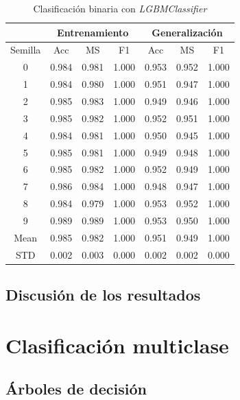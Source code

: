 \begin{table}[H]
	\centering
	\begin{tabular}{ |c|c|c|c|c|c|c| }
		\hline
		\rowcolor{LightCyan}
		 & \multicolumn{3}{c|}{Entrenamiento} & \multicolumn{3}{c|}{Generalización} \\
		\hline
		\rowcolor{LightCyan}
		 Semilla & Acc & MS & F1 & Acc & MS & F1 \\
		\hline
		0 & 0.984 & 0.981 & 1.000 & 0.953 & 0.952 & 1.000 \\
		1 & 0.984 & 0.980 & 1.000 & 0.951 & 0.947 & 1.000 \\
		2 & 0.985 & 0.983 & 1.000 & 0.949 & 0.946 & 1.000 \\
		3 & 0.985 & 0.982 & 1.000 & 0.952 & 0.951 & 1.000 \\
		4 & 0.984 & 0.981 & 1.000 & 0.950 & 0.945 & 1.000 \\
		5 & 0.985 & 0.981 & 1.000 & 0.949 & 0.948 & 1.000 \\
		6 & 0.985 & 0.982 & 1.000 & 0.952 & 0.949 & 1.000 \\
		7 & 0.986 & 0.984 & 1.000 & 0.948 & 0.947 & 1.000 \\
		8 & 0.984 & 0.979 & 1.000 & 0.953 & 0.952 & 1.000 \\
		9 & 0.989 & 0.989 & 1.000 & 0.953 & 0.950 & 1.000 \\
		Mean & 0.985 & 0.982 & 1.000 & 0.951 & 0.949 & 1.000 \\
		STD & 0.002 & 0.003 & 0.000 & 0.002 & 0.002 & 0.000 \\
		\hline
	\end{tabular}
	\caption{Clasificación binaria con \textit{LGBMClassifier}}
	\label{tabla:lgbm_bin}
\end{table}

\subsection{Discusión de los resultados}
\label{subsec:discusion}

\section{Clasificación multiclase}
\label{sec:clas_multi}

\subsection{Árboles de decisión}
\label{subsec:dt_multi}



